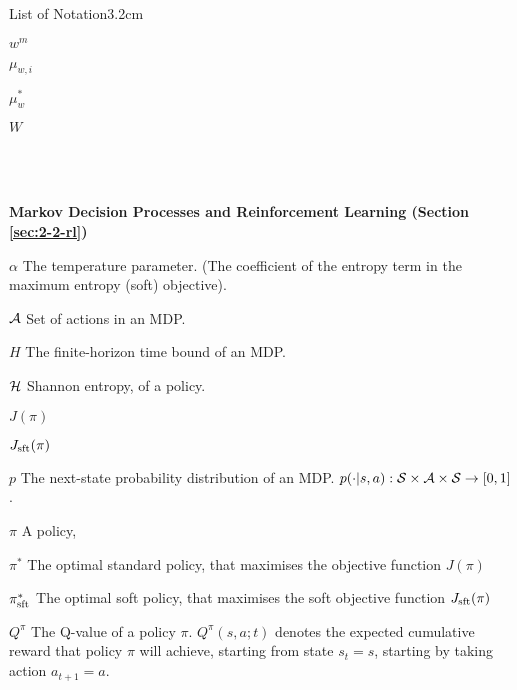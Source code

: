 \begin{mclistof}{List of Notation}{3.2cm}
    \item[$w^m$] 
    \item[$\mu_{w,i}$] 
    \item[$\mu_{w}^*$] 
    \item[$W$] 
    \item[$ $] 
    \item[$ $] 
    \item[$ $] 
    \item[$ $] 
    \\
    \item[\Large\textbf{Markov Decision Processes and Reinforcement Learning (Section \ref{sec:2-2-rl})}\hfill\hfill]
    \item[$\alpha$] 
        The temperature parameter. (The coefficient of the entropy term in the maximum entropy (soft) objective).
    \item[$\mathcal{A}$] 
        Set of actions in an MDP.
    \item[$H$] 
        The finite-horizon time bound of an MDP. 
    \item[$\mathcal{H}$]
        Shannon entropy, of a policy.
    \item[$J(\pi)$] 
    \item[$J_{{\textnormal{sft}}}(\pi)$] 
    \item[$p$] 
        The next-state probability distribution of an MDP.  $p(\cdot | s,a) : \mathcal{S} \times \mathcal{A} \times \mathcal{S} \rightarrow [0,1]$.
    \item[$\pi$]
        A policy, 
    \item[$\pi^*$]
        The optimal standard policy, that maximises the objective function $J(\pi)$
    \item[$\pi_{{\textnormal{sft}}}^*$]
        The optimal soft policy, that maximises the soft objective function $J_{{\textnormal{sft}}}(\pi)$
    \item[$Q^{\pi}$]
        The Q-value of a policy $\pi$. $Q^{\pi}(s,a;t)$ denotes the expected cumulative reward that policy $\pi$ will achieve, starting from state $s_t=s$, starting by taking action $a_{t+1}=a$.

\end{mclistof}
